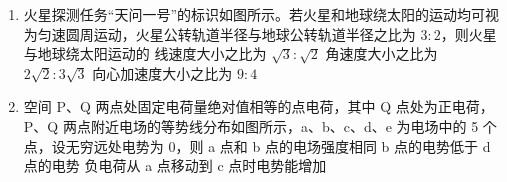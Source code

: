 \documentclass[\gkver]{gaokaozhenti}
\begin{document}
\begin{enumerate}
{B．由于 $v_{y}=\frac{Eq}{m}t=2v_{0}$，故粒子速度大小为 $v=\sqrt{v_{0}^{2}+v_{y}^{2}}=\sqrt{5}v_{0}$，故 B 错误；

C．由几何关系可知，到 P 点的距离为 $L=\sqrt{2}v_{0}t=\frac{2\sqrt{2}mv_{0}^{2}}{Eq}$，故 C 正确；

D．由于平抛推论可知，$\tan\alpha=2\tan\beta$，可知速度正切 $\tan\alpha=2\tan 45^{\circ}=2>\tan 60^{\circ}$，可知速度方向与竖直方向的夹角小于 $30^{\circ}$，故 D 错误。

故选 C。
}

\item
火星探测任务“天问一号”的标识如图所示。若火星和地球绕太阳的运动均可视为匀速圆周运动，火星公转轨道半径与地球公转轨道半径之比为 $3:2$，则火星与地球绕太阳运动的
{线速度大小之比为 $\sqrt{3}:\sqrt{2}$}
{角速度大小之比为 $2\sqrt{2}:3\sqrt{3}$}
{向心加速度大小之比为 $9:4$}

\item
空间 P、Q 两点处固定电荷量绝对值相等的点电荷，其中 Q 点处为正电荷，P、Q 两点附近电场的等势线分布如图所示，a、b、c、d、e 为电场中的 5 个点，设无穷远处电势为 0，则
\onepicture[w=5.65cm]{}
{a 点和 b 点的电场强度相同}
{b 点的电势低于 d 点的电势}
{负电荷从 a 点移动到 c 点时电势能增加}
\end{enumerate}
\end{document}
